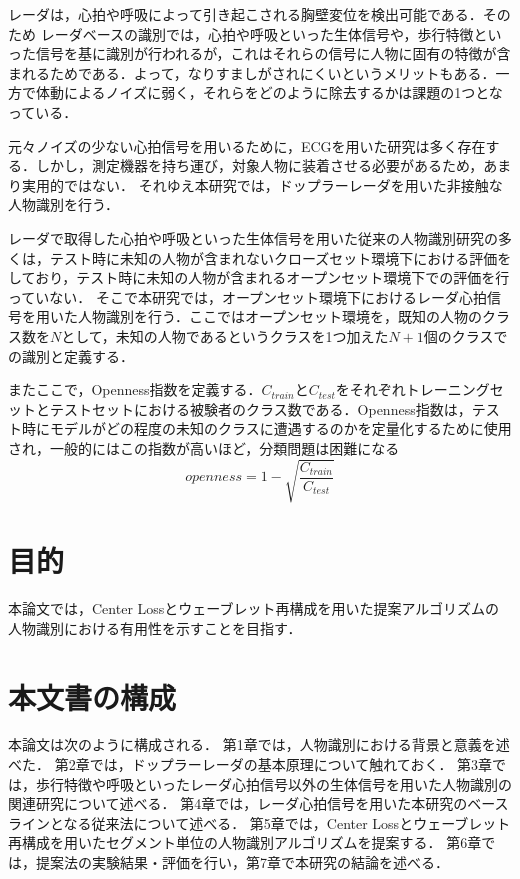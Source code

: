 レーダは，心拍や呼吸によって引き起こされる胸壁変位を検出可能である\cite{paper:Wireless_survey}．そのため
レーダベースの識別では，心拍や呼吸といった生体信号や，歩行特徴といった信号を基に識別が行われるが，これはそれらの信号に人物に固有の特徴が含まれるためである．よって，なりすましがされにくいというメリットもある\cite{paper:HeartSignature}．一方で体動によるノイズに弱く，それらをどのように除去するかは課題の1つとなっている．

元々ノイズの少ない心拍信号を用いるために，ECGを用いた研究は多く存在する\cite{paper:ecg1, paper:ecg2, paper:ensemble}．しかし，測定機器を持ち運び，対象人物に装着させる必要があるため，あまり実用的ではない\cite{paper:Xing}．
それゆえ本研究では，ドップラーレーダを用いた非接触な人物識別を行う．

レーダで取得した心拍や呼吸といった生体信号を用いた従来の人物識別研究の多くは，テスト時に未知の人物が含まれないクローズセット環境下における評価をしており，テスト時に未知の人物が含まれるオープンセット環境下での評価を行っていない．
そこで本研究では，オープンセット環境下におけるレーダ心拍信号を用いた人物識別を行う．ここではオープンセット環境を，既知の人物のクラス数を$N$として，未知の人物であるというクラスを1つ加えた$N+1$個のクラスでの識別と定義する．

またここで，Openness指数を定義する．$C_{train}$と$C_{test}$をそれぞれトレーニングセットとテストセットにおける被験者のクラス数である．Openness指数は，テスト時にモデルがどの程度の未知のクラスに遭遇するのかを定量化するために使用され，一般的にはこの指数が高いほど，分類問題は困難になる\cite{paper:HeartSignature}
\begin{equation}\label{}
  openness = 1 - \sqrt{\frac{C_{train}}{C_{test}}}
\end{equation}

\section{目的}
本論文では，Center Lossとウェーブレット再構成を用いた提案アルゴリズムの人物識別における有用性を示すことを目指す．

\section{本文書の構成}
本論文は次のように構成される．
第1章では，人物識別における背景と意義を述べた．
第2章では，ドップラーレーダの基本原理について触れておく．
第3章では，歩行特徴や呼吸といったレーダ心拍信号以外の生体信号を用いた人物識別の関連研究について述べる．
第4章では，レーダ心拍信号を用いた本研究のベースラインとなる従来法について述べる．
第5章では，Center Lossとウェーブレット再構成を用いたセグメント単位の人物識別アルゴリズムを提案する．
第6章では，提案法の実験結果・評価を行い，第7章で本研究の結論を述べる．


